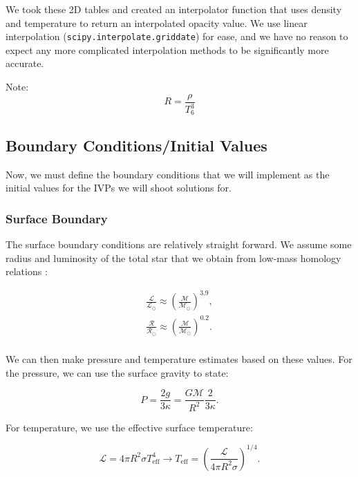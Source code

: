 \documentclass[twocolumn]{aastex631}
\begin{document}
We took these 2D tables and created an interpolator function that uses density and temperature to return an interpolated opacity value. We use linear interpolation (\texttt{scipy.interpolate.griddate}) for ease, and we have no reason to expect any more complicated interpolation methods to be significantly more accurate.

Note:
\begin{equation}
	R = \frac{\rho}{T_6^3}
\end{equation}

\subsection{Boundary Conditions/Initial Values}

Now, we must define the boundary conditions that we will implement as the initial values for the IVPs we will shoot solutions for.

\subsubsection{Surface Boundary}

The surface boundary conditions are relatively straight forward. We assume some radius and luminosity of the total star that we obtain from low-mass homology relations \citep{stelint}:

\begin{equation}
\boxed{
\begin{array}{lcl}
\frac{\mathcal{L}}{\mathcal{L}_\odot} \approx \left(\frac{\mathcal{M}}{\mathcal{M}_\odot}\right)^{3.9}, \\
\frac{\mathcal{R}}{\mathcal{R}_\odot} \approx \left(\frac{\mathcal{M}}{\mathcal{M}_\odot}\right)^{0.2}. \\
\end{array}
}
\end{equation}

\noindent We can then make pressure and temperature estimates based on these values. For the pressure, we can use the surface gravity to state:

\begin{equation}
	P = \frac{2g}{3\kappa} = \frac{G\mathcal{M}}{R^2} \frac{2}{3\kappa}.
\end{equation}

\noindent For temperature, we use the effective surface temperature:

\begin{equation}
	\mathcal{L} = 4\pi R^2 \sigma T_{\text{eff}}^4 \rightarrow T_\text{eff} = \left(\frac{\mathcal{L}}{4\pi R^2 \sigma}\right)^{1/4}.
\end{equation}
\end{document}
